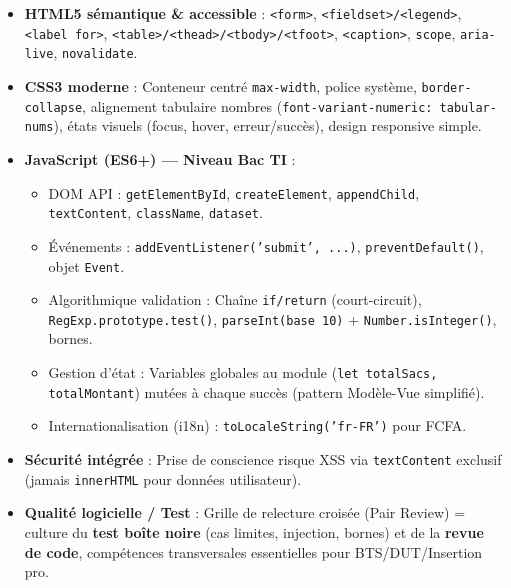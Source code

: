 \documentclass[11pt]{article}
\newcommand{\cle}[1]{{\popxbold\color{popdark}#1}}
\begin{document}
\begin{itemize}
    \item \textbf{HTML5 sémantique \& accessible} : \texttt{<form>}, \texttt{<fieldset>/<legend>}, \texttt{<label for>}, \texttt{<table>/<thead>/<tbody>/<tfoot>}, \texttt{<caption>}, \texttt{scope}, \texttt{aria-live}, \texttt{novalidate}.
    \item \textbf{CSS3 moderne} : Conteneur centré \texttt{max-width}, police système, \texttt{border-collapse}, alignement tabulaire nombres (\texttt{font-variant-numeric: tabular-nums}), états visuels (focus, hover, erreur/succès), design responsive simple.
    \item \textbf{JavaScript (ES6+) — Niveau Bac TI} :
    \begin{itemize}
        \item \cle{DOM API} : \texttt{getElementById}, \texttt{createElement}, \texttt{appendChild}, \texttt{textContent}, \texttt{className}, \texttt{dataset}.
        \item \cle{Événements} : \texttt{addEventListener('submit', ...)}, \texttt{preventDefault()}, objet \texttt{Event}.
        \item \cle{Algorithmique validation} : Chaîne \texttt{if/return} (court-circuit), \texttt{RegExp.prototype.test()}, \texttt{parseInt(base 10)} + \texttt{Number.isInteger()}, bornes.
        \item \cle{Gestion d'état} : Variables globales au module (\texttt{let totalSacs, totalMontant}) mutées à chaque succès (pattern Modèle-Vue simplifié).
        \item \cle{Internationalisation (i18n)} : \texttt{toLocaleString('fr-FR')} pour FCFA.
    \end{itemize}
    \item \textbf{Sécurité intégrée} : Prise de conscience risque XSS via \texttt{textContent} exclusif (jamais \texttt{innerHTML} pour données utilisateur).
    \item \textbf{Qualité logicielle / Test} : Grille de relecture croisée (Pair Review) = culture du \textbf{test boîte noire} (cas limites, injection, bornes) et de la \textbf{revue de code}, compétences transversales essentielles pour BTS/DUT/Insertion pro.
\end{itemize}
\end{document}
